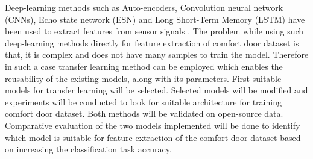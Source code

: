     Deep-learning methods such as Auto-encoders, Convolution neural network (CNNs), Echo state network (ESN) and Long Short-Term Memory (LSTM) have been used to extract features from sensor  signals \cite{supratak2014feature}. The problem while using such deep-learning methods directly for feature extraction of comfort door dataset is that, it is complex and does not have many samples to train the model. Therefore in such a case transfer learning method can be employed which enables the reusability of the existing models, along with its parameters. First suitable models for transfer learning will be selected. Selected models will be modified and experiments will be conducted to look for suitable architecture for training comfort door dataset. Both methods will be validated on open-source data. Comparative evaluation of the two models implemented will be done to identify which model is suitable for feature extraction of the comfort door dataset based on increasing the classification task accuracy.
    
    



